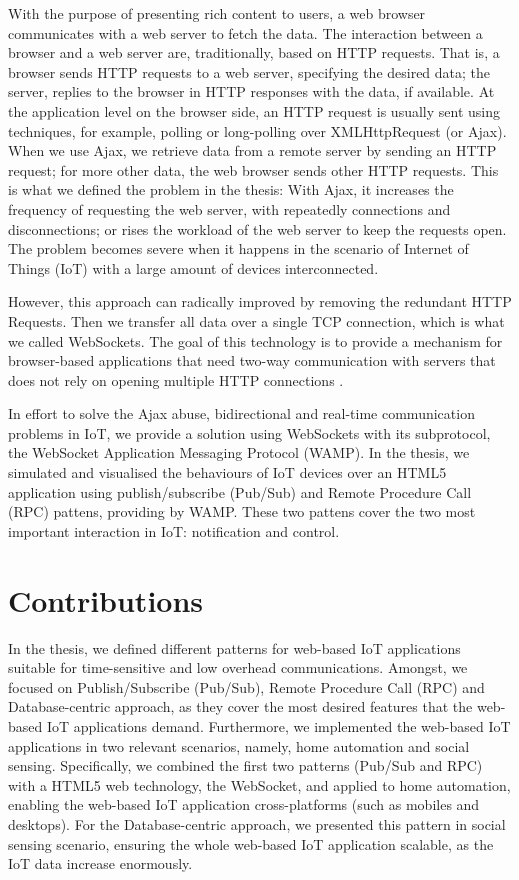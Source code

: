 With the purpose of presenting rich content to users, a web browser communicates with a web server to fetch the data. The interaction between a browser and a web server are, traditionally, based on HTTP requests. That is, a browser sends HTTP requests to a web server, specifying the desired data; the server, replies to the browser in HTTP responses with the data, if available. At the application level on the browser side, an HTTP request is usually sent using techniques, for example, polling or long-polling over XMLHttpRequest (or Ajax). When we use Ajax, we retrieve data from a remote server by sending an HTTP request; for more other data, the web browser sends other HTTP requests. This is what we defined the problem in the thesis: With Ajax, it increases the frequency of requesting the web server, with repeatedly connections and disconnections; or rises the workload of the web server to keep the requests open. The problem becomes severe when it happens in the scenario of Internet of Things (IoT) with a large amount of devices interconnected.

However, this approach can radically improved by removing the redundant HTTP Requests. Then we transfer all data over a single TCP connection, which is what we called WebSockets. The goal of this technology is to provide a mechanism for browser-based applications that need two-way communication with servers that does not rely on opening multiple HTTP connections \cite{rfc64552012web}.

In effort to solve the Ajax abuse, bidirectional and real-time communication problems in IoT, we provide a solution using WebSockets with its subprotocol, the WebSocket Application Messaging Protocol (WAMP). In the thesis, we simulated and visualised the behaviours of IoT devices over an HTML5 application using publish/subscribe (Pub/Sub) and Remote Procedure Call (RPC) pattens, providing by WAMP. These two pattens cover the two most important interaction in IoT: notification and control.

\section{Contributions}

In the thesis, we defined different patterns for web-based IoT applications suitable for time-sensitive and low overhead communications. Amongst, we focused on Publish/Subscribe (Pub/Sub), Remote Procedure Call (RPC) and Database-centric approach, as they cover the most desired features that the web-based IoT applications demand. Furthermore, we implemented the web-based IoT applications in two relevant scenarios, namely, home automation and social sensing. Specifically, we combined the first two patterns (Pub/Sub and RPC) with a HTML5 web technology, the WebSocket, and applied to home automation, enabling the web-based IoT application cross-platforms (such as mobiles and desktops). For the Database-centric approach, we presented this pattern in social sensing scenario, ensuring the whole web-based IoT application scalable, as the IoT data increase enormously.  

